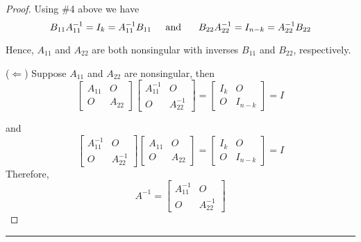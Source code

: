\begin{theorem}
\begin{proof}
	Using \#4 above we have
	\[  B_{11}  A_{11}^{-1}  = I_k  =  A_{11}^{-1}B_{11}    \text{\;\;\;\;  and \;\;\;\; } B_{22} A_{22}^{-1}  =  I_{n-k}  = A_{22}^{-1} B_{22} \]
	
	
	
	Hence, $A_{11}$ and $A_{22}$  are both nonsingular with inverses $B_{11}$ and $B_{22}$, respectively.
	
	($\Leftarrow$) Suppose $A_{11}$ and $A_{22}$ are nonsingular, then 
	\[   \begin{bmatrix}  A_{11}   &  O \\ O  &  A_{22}  \end{bmatrix}  \begin{bmatrix}  A_{11}^{-1}   &  O \\ O  &  A_{22}^{-1}  \end{bmatrix}  =  \begin{bmatrix}  I_{k}   &  O \\ O  &  I_{n-k}  \end{bmatrix} = I  \]
	
	and 
	\[  \begin{bmatrix}  A_{11}^{-1}   &  O \\ O  &  A_{22}^{-1}  \end{bmatrix}   \begin{bmatrix}  A_{11}   &  O \\ O  &  A_{22}  \end{bmatrix}    =  \begin{bmatrix}  I_{k}   &  O \\ O  &  I_{n-k}  \end{bmatrix} = I  \]
Therefore, 
\[  A^{-1} = \begin{bmatrix}  A_{11}^{-1}   &  O \\ O  &  A_{22}^{-1}  \end{bmatrix}  \]	 
 \end{proof}
 \end{theorem}



\rule[0.01in]{\textwidth}{0.0025in}

























